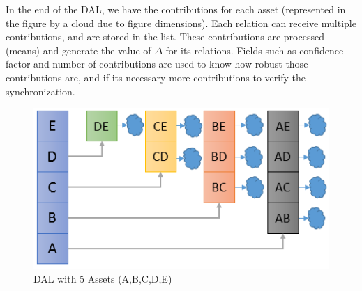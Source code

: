 In the end of the DAL, we have the contributions for each asset (represented in the figure by a cloud due to figure dimensions). Each relation can receive multiple contributions, and are stored in the list. These contributions are processed (means) and generate the value of $\Delta$ for its relations. Fields such as confidence factor and number of contributions are used to know how robust those contributions are, and if its necessary more contributions to verify the synchronization.

\begin{figure}
	\centering
	\includegraphics[scale=0.8]{figure/dal/dal}
	\caption{DAL with 5 Assets (A,B,C,D,E)}
	\label{dal}
\end{figure}







